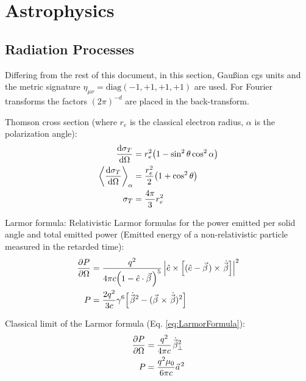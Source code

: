 \section{Astrophysics}
	\subsection{Radiation Processes}
		Differing from the rest of this document, in this section, Gaußian cgs units and the metric signature $\eta_{\mu\nu}=\mathrm{diag}(-1,+1,+1,+1)$ are used. For Fourier transforms the factors $(2\pi)^{-d}$ are placed in the back-transform.

		Thomson cross section (where $r_e$ is the classical electron radius, $\alpha$ is the polarization angle):
		\begin{equation}
			\begin{aligned}
				\dv{\sigma_T}{\Omega} &= r_e^2 \qty(1-\sin^2 \theta \cos^2 \alpha) \\
				\left\langle \dv{\sigma_T}{\Omega} \right\rangle_{\alpha} &= \frac{r_e^2}{2} \qty(1+\cos^2 \theta) \\
				\sigma_T &= \frac{4\pi}{3}r_e^2 \\
			\end{aligned}
		\end{equation}

		\noindent
		Larmor formula:
		Relativistic Larmor formulas for the power emitted per solid angle and total emitted power (Emitted energy of a non-relativistic particle measured in the retarded time):
		\begin{equation}
			\label{eq:LarmorFormula}
			\begin{aligned}
				\pdv{P}{\Omega} &= \frac{q^2}{4\pi c\qty(1-\hat{e}\cdot\vec{\beta})^5} \left| \hat{e}\times\qty[(\hat{e}-\vec{\beta}) \times \dot{\vec{\beta}}] \right|^2 \\
				P &= \frac{2q^2}{3c}\gamma^6\qty[\dot{\vec{\beta}}^2 - (\vec{\beta}\times\dot{\vec{\beta}})^2] \\
			\end{aligned}
		\end{equation}

		\noindent 
		Classical limit of the Larmor formula (Eq. \ref{eq:LarmorFormula}):
		\begin{equation}
			\begin{aligned}
				\pdv{P}{\Omega} &= \frac{q^2}{4\pi c}\dot{\vec{\beta}}_\perp^2 \\
				P &= \frac{q^2 \mu_0}{6\pi c}\vec{a}^2\\
			\end{aligned}
		\end{equation}


